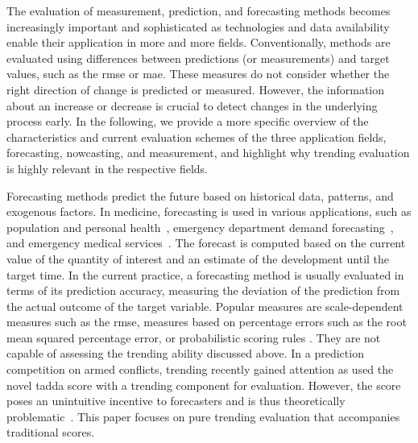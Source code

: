 The evaluation of measurement, prediction, and forecasting methods becomes increasingly important and sophisticated as technologies and data availability enable their application in more and more fields. 
Conventionally, methods are evaluated using differences between predictions (or measurements) and target values, such as the \ac{rmse} or \ac{mae}. 
These measures do not consider whether the right direction of change is predicted or measured.
However, the information about an increase or decrease is crucial to detect changes in the underlying process early. 
In the following, we provide a more specific overview of the characteristics and current evaluation schemes of the three application fields, forecasting, nowcasting, and measurement, and highlight why trending evaluation is highly relevant in the respective fields.

Forecasting methods predict the future based on historical data, patterns, and exogenous factors. 
In medicine, forecasting is used in various applications, such as population and personal health~\parencite[see, e.g., the review in]{Soyiri2013}, emergency department demand forecasting~\parencite{Jones2008,Rostami-Tabar2023}, and emergency medical services~\parencite{HaugsboHermansen2021}.
The forecast is computed based on the current value of the quantity of interest and an estimate of the development until the target time.
In the current practice, a forecasting method is usually evaluated in terms of its prediction accuracy, measuring the deviation of the prediction from the actual outcome of the target variable. 
Popular measures are scale-dependent measures such as the \ac{rmse}, measures based on percentage errors such as the root mean squared percentage error, or probabilistic scoring rules \citep[see the review in][]{hyndman2006another}. 
They are not capable of assessing the trending ability discussed above.
In a prediction competition on armed conflicts, trending recently gained attention as \citet{Vesco2022} used the novel \ac{tadda} score with a trending component for evaluation. 
However, the score poses an unintuitive incentive to forecasters and is thus theoretically problematic~\parencite{Bracher2023}.
This paper focuses on pure trending evaluation that accompanies traditional scores.

